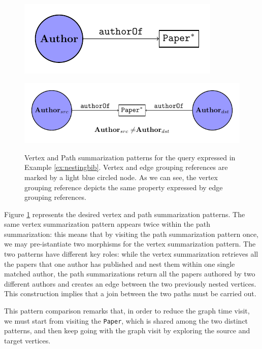 \begin{example}
\begin{figure}[!t]
	\centering
	\begin{minipage}[!t]{0.5\textwidth}
		\centering
		\includegraphics[width=.6\textwidth]{images/nesting/patterns/00_vertex_pattern.pdf}
		\label{fig:vertexPat}
	\end{minipage} \begin{minipage}[!t]{0.4\textwidth}
		\centering
		\includegraphics[width=1\textwidth]{00_path_pattern.pdf}
		\label{fig:pathPat}
	\end{minipage}
	\caption{Vertex and Path summarization patterns for the query expressed in Example \ref{ex:nestingbib}. Vertex and edge grouping references are marked by a light blue circled node. As we can see, the vertex grouping reference depicts the same property expressed by edge grouping references.}
	\label{fig:patterns}
\end{figure}
	Figure \ref{fig:patterns} represents the desired vertex and path summarization patterns. The same vertex summarization pattern appears twice within the path summarization: this means that by visiting the path summarization pattern once, we may pre-istantiate two morphisms for the vertex summarization pattern. The two patterns have different key roles: while the vertex summarization retrieves all the papers that one author has published and nest them within one single matched author, the path summarizations return all the papers authored by two different authors and creates an edge between the two previously nested vertices. This construction implies that a join between the two paths must be carried out. 
	
	This pattern comparison remarks that, in order to reduce the graph time visit, we must start from visiting the \texttt{Paper}, which is shared among the two distinct patterns, and then keep going with the graph visit by exploring the source and target vertices. 
\end{example}

